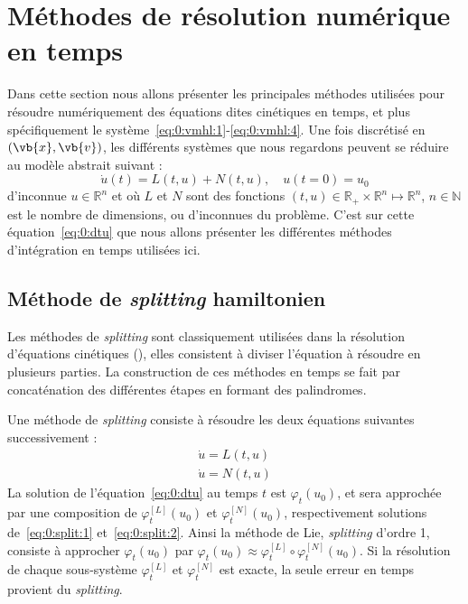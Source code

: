 
\section{Méthodes de résolution numérique en temps}

Dans cette section nous allons présenter les principales méthodes utilisées pour résoudre numériquement des équations dites cinétiques en temps, et plus spécifiquement le système~\eqref{eq:0:vmhl:1}-\eqref{eq:0:vmhl:4}. Une fois discrétisé en $(\vb{x},\vb{v})$, les différents systèmes que nous regardons peuvent se réduire au modèle abstrait suivant :
\begin{equation}
  \dot{u}(t) = L(t,u) + N(t,u),\quad u(t=0)=u_0
  \label{eq:0:dtu}
\end{equation}
d'inconnue $u\in\mathbb{R}^n$ et où $L$ et $N$ sont des fonctions $(t,u)\in\mathbb{R}_+\times\mathbb{R}^n\mapsto\mathbb{R}^n$, $n\in\mathbb{N}$ est le nombre de dimensions, ou d'inconnues du problème. C'est sur cette équation~\eqref{eq:0:dtu} que nous allons présenter les différentes méthodes d'intégration en temps utilisées ici.

\subsection{Méthode de \emph{splitting} hamiltonien}

Les méthodes de \emph{splitting} sont classiquement utilisées dans la résolution d'équations cinétiques (\cite{Morrison:2017,Grandgirard:2006,Tronci:2010,Tronci:2014}), elles consistent à diviser l'équation à résoudre en plusieurs parties. La construction de ces méthodes en temps se fait par concaténation des différentes étapes en formant des palindromes.

Une méthode de \emph{splitting} consiste à résoudre les deux équations suivantes successivement :
\begin{eqnarray}
    \dot{u} = L(t,u) \label{eq:0:split:1}\\
    \dot{u} = N(t,u) \label{eq:0:split:2}
\end{eqnarray}
La solution de l'équation~\eqref{eq:0:dtu} au temps $t$ est $\varphi_t(u_0)$, et sera approchée par une composition de $\varphi_t^{[L]}(u_0)$ et $\varphi_t^{[N]}(u_0)$, respectivement solutions de~\eqref{eq:0:split:1} et~\eqref{eq:0:split:2}. Ainsi la méthode de Lie, \emph{splitting} d'ordre 1, consiste à approcher $\varphi_t(u_0)$ par $\varphi_t(u_0)\approx \varphi_t^{[L]} \circ \varphi_t^{[N]}(u_0)$. Si la résolution de chaque sous-système $\varphi_t^{[L]}$ et $\varphi_t^{[N]}$ est exacte, la seule erreur en temps provient du \emph{splitting}.

